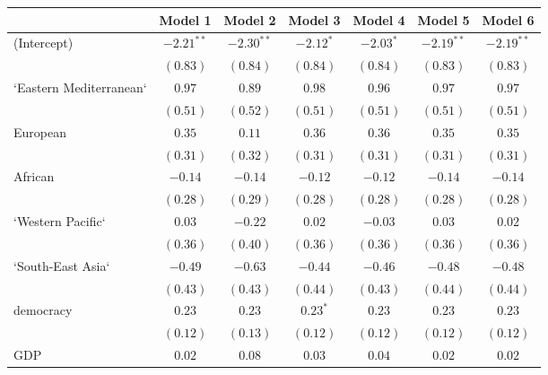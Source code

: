 
\begin{table}[!h]
\begin{center}
\begin{tabular}{l c c c c c c }
\toprule
 & Model 1 & Model 2 & Model 3 & Model 4 & Model 5 & Model 6 \\
\midrule
(Intercept)             & $-2.21^{**}$ & $-2.30^{**}$ & $-2.12^{*}$  & $-2.03^{*}$  & $-2.19^{**}$ & $-2.19^{**}$ \\
                        & $(0.83)$     & $(0.84)$     & $(0.84)$     & $(0.84)$     & $(0.83)$     & $(0.83)$     \\
`Eastern Mediterranean` & $0.97$       & $0.89$       & $0.98$       & $0.96$       & $0.97$       & $0.97$       \\
                        & $(0.51)$     & $(0.52)$     & $(0.51)$     & $(0.51)$     & $(0.51)$     & $(0.51)$     \\
European                & $0.35$       & $0.11$       & $0.36$       & $0.36$       & $0.35$       & $0.35$       \\
                        & $(0.31)$     & $(0.32)$     & $(0.31)$     & $(0.31)$     & $(0.31)$     & $(0.31)$     \\
African                 & $-0.14$      & $-0.14$      & $-0.12$      & $-0.12$      & $-0.14$      & $-0.14$      \\
                        & $(0.28)$     & $(0.29)$     & $(0.28)$     & $(0.28)$     & $(0.28)$     & $(0.28)$     \\
`Western Pacific`       & $0.03$       & $-0.22$      & $0.02$       & $-0.03$      & $0.03$       & $0.02$       \\
                        & $(0.36)$     & $(0.40)$     & $(0.36)$     & $(0.36)$     & $(0.36)$     & $(0.36)$     \\
`South-East Asia`       & $-0.49$      & $-0.63$      & $-0.44$      & $-0.46$      & $-0.48$      & $-0.48$      \\
                        & $(0.43)$     & $(0.43)$     & $(0.44)$     & $(0.43)$     & $(0.44)$     & $(0.44)$     \\
democracy               & $0.23$       & $0.23$       & $0.23^{*}$   & $0.23$       & $0.23$       & $0.23$       \\
                        & $(0.12)$     & $(0.13)$     & $(0.12)$     & $(0.12)$     & $(0.12)$     & $(0.12)$     \\
GDP                     & $0.02$       & $0.08$       & $0.03$       & $0.04$       & $0.02$       & $0.02$       \\

\end{tabular}
\end{center}
\end{table}

